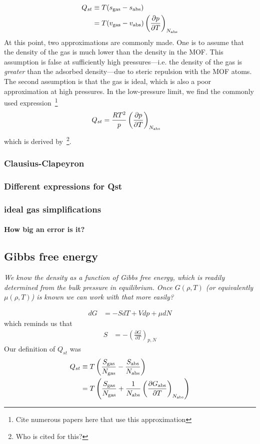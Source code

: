 \documentclass[letterpaper,twocolumn,amsmath,amssymb,jcp,aps,10pt]{revtex4-1}
\begin{document}
\begin{align}
    Q_{st} &\equiv T(s_{\text{gas}} - s_{\text{abs}}) \\
    &= T(v_{\text{gas}} - v_{\text{abs}})\left(\frac{\partial p}{\partial T}\right)_{N_{\text{abs}}}
\end{align}
At this point, two approximations are commonly made.  One is to assume that the density of the gas is much lower than the density in the MOF.  This assumption is false at sufficiently high pressures---i.e. the density of the gas is \emph{greater} than the adsorbed density---due to steric repulsion with the MOF atoms.  The second assumption is that the gas is ideal, which is also a poor approximation at high pressures.  In the low-pressure limit, we find the commonly used expression~\footnote{Cite numerous papers here that use this approximation}
\begin{align}
    Q_{st} &= \frac{RT^2}{p}\left(\frac{\partial p}{\partial T}\right)_{N_{\text{abs}}}
\end{align}
which is derived by~\footnote{Who is cited for this?}.

\subsubsection{Clausius-Clapeyron}
\subsubsection{Different expressions for Qst}
\subsubsection{ideal gas simplifications}
\paragraph{How big an error is it?}
\subsection{Gibbs free energy}
\emph{We know the density as a function of Gibbs free energy, which is readily determined from the bulk pressure in equilibrium.  Once $G(\rho,T)$ (or equivalently $\mu(\rho,T)$) is known we can work with that more easily?}

\begin{align}
    dG &= -SdT + Vdp + \mu dN
\end{align}
which reminds us that
\begin{align}
    S &= -\left(\frac{\partial G}{\partial T}\right)_{p,N}
\end{align}
Our definition of $Q_{st}$ was
\begin{align}
    Q_{st} &\equiv T\left(\frac{S_{\text{gas}}}{N_{\text{gas}}} - \frac{S_{\text{abs}}}{N_{\text{abs}}}\right)
    \\
    &= T\left(\frac{S_{\text{gas}}}{N_{\text{gas}}} + \frac{1}{N_{\text{abs}}}\left(\frac{\partial G_{\text{abs}}}{\partial T}\right)_{N_{\text{abs}}}\right)
\end{align}
\end{document}
